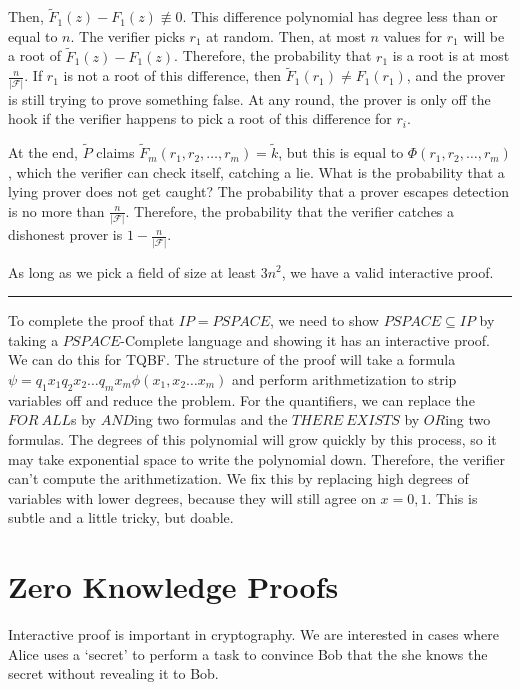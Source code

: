 \documentclass[twoside]{article}
\newenvironment{proof}{{\bf Proof:}}{\hfill\rule{2mm}{2mm}}
\begin{document}
\begin{proof}
Then, $\tilde{F}_1(z) - F_1(z)\not\equiv0$.  This difference polynomial has degree less than or equal to $n$.  The verifier picks $r_1$ at random.  Then, at most $n$ values for $r_1$ will be a root of $\tilde{F}_1(z) - F_1(z)$.  Therefore, the probability that $r_1$ is a root is at most $\frac{n}{|\mathcal{F}|}$.  If $r_1$ is not a root of this difference, then $\tilde{F}_1(r_1) \neq F_1(r_1)$, and the prover is still trying to prove something false.  At any round, the prover is only off the hook if the verifier happens to pick a root of this difference for $r_i$.

At the end, $\tilde{P}$ claims $\tilde{F}_m(r_1,r_2,\dots,r_m) = \tilde{k}$, but this is equal to $\Phi(r_1,r_2,\dots,r_m)$, which the verifier can check itself, catching a lie.  What is the probability that a lying prover does not get caught?  The probability that a prover escapes detection is no more than $\frac{n}{|\mathcal{F}|}$.  Therefore, the probability that the verifier catches a dishonest prover is $1-\frac{n}{|\mathcal{F}|}$.

As long as we pick a field of size at least $3n^2$, we have a valid interactive proof.

\end{proof}

To complete the proof that $IP=PSPACE$, we need to show $PSPACE\subseteq IP$ by taking a $PSPACE$-Complete language and showing it has an interactive proof.  We can do this for TQBF.  The structure of the proof will take a formula $\psi=q_1x_1q_2x_2\dots q_mx_m \phi(x_1,x_2\dots x_m)$ and perform arithmetization to strip variables off and reduce the problem.  For the quantifiers, we can replace the $FOR\ ALL$s by $AND$ing two formulas and the $THERE \ EXISTS$ by $OR$ing two formulas.  The degrees of this polynomial will grow quickly by this process, so it may take exponential space to write the polynomial down.  Therefore, the verifier can't compute the arithmetization.  We fix this by replacing high degrees of variables with lower degrees, because they will still agree on $x=0,1$.  This is subtle and a little tricky, but doable.




\section*{Zero Knowledge Proofs}

Interactive proof is important in cryptography.  We are interested in cases where Alice uses a `secret' to perform a task to convince Bob that the she knows the secret without revealing it to Bob.
\end{document}
